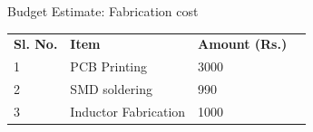 \documentclass[aspectratio=169]{beamer}
\begin{document}
	
	\begin{frame}{Budget Estimate: Fabrication cost}
		\begin{table}[]
			\begin{tabular}{|l|l|l|l}
				\cline{1-3}
				\textbf{Sl. No.} & \textbf{Item}        & \textbf{Amount (Rs.)} &  \\ \cline{1-3}
				1                & PCB Printing         & 3000                    &  \\ \cline{1-3}
				2                & SMD soldering        & 990                    &  \\ \cline{1-3}
				3                & Inductor Fabrication & 1000                  &  \\ \cline{1-3}
			\end{tabular}
		\end{table}
	\end{frame}
	
	
\end{document}
